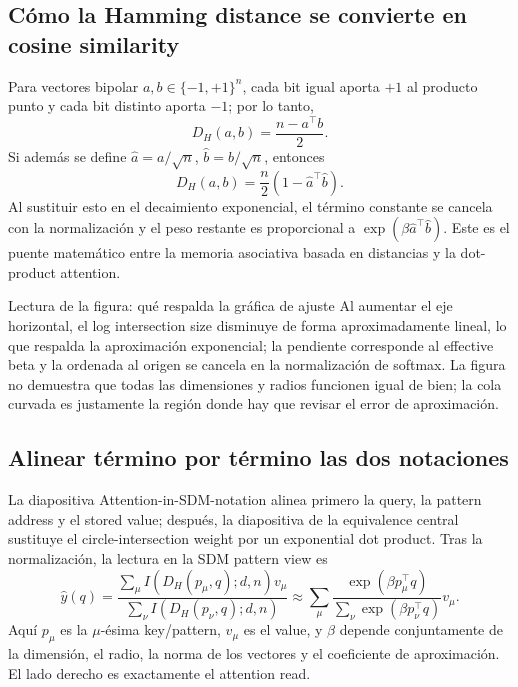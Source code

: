 \subsection{Cómo la Hamming distance se convierte en cosine similarity}

Para vectores bipolar $a,b\in\{-1,+1\}^{n}$, cada bit igual aporta $+1$ al producto punto y cada bit distinto aporta $-1$; por lo tanto,
$$
D_H(a,b)=\frac{n-a^{\top}b}{2}.
$$
Si además se define $\hat a=a/\sqrt n$, $\hat b=b/\sqrt n$, entonces
$$
D_H(a,b)=\frac{n}{2}\left(1-\hat a^{\top}\hat b\right).
$$
Al sustituir esto en el decaimiento exponencial, el término constante se cancela con la normalización y el peso restante es proporcional a $\exp(\beta\hat a^{\top}\hat b)$. Este es el puente matemático entre la memoria asociativa basada en distancias y la dot-product attention.



\begin{knowledgebox}{Lectura de la figura: qué respalda la gráfica de ajuste}
Al aumentar el eje horizontal, el log intersection size disminuye de forma aproximadamente lineal, lo que respalda la aproximación exponencial; la pendiente corresponde al effective beta y la ordenada al origen se cancela en la normalización de softmax. La figura no demuestra que todas las dimensiones y radios funcionen igual de bien; la cola curvada es justamente la región donde hay que revisar el error de aproximación.
\end{knowledgebox}

\subsection{Alinear término por término las dos notaciones}

La diapositiva Attention-in-SDM-notation alinea primero la query, la pattern address y el stored value; después, la diapositiva de la equivalence central sustituye el circle-intersection weight por un exponential dot product. Tras la normalización, la lectura en la SDM pattern view es
$$
\hat y(q)
=\frac{\sum_\mu I(D_H(p_\mu,q);d,n)v_\mu}
{\sum_\nu I(D_H(p_\nu,q);d,n)}
\approx
\sum_\mu
\frac{\exp(\beta p_\mu^{\top}q)}
{\sum_\nu\exp(\beta p_\nu^{\top}q)}v_\mu.
$$
Aquí $p_\mu$ es la $\mu$-ésima key/pattern, $v_\mu$ es el value, y $\beta$ depende conjuntamente de la dimensión, el radio, la norma de los vectores y el coeficiente de aproximación. El lado derecho es exactamente el attention read.


